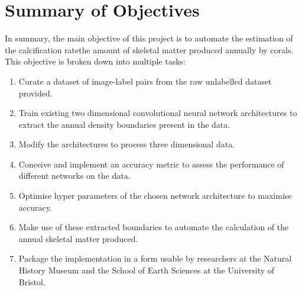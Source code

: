 \section{Summary of Objectives}

In summary, the main objective of this project is to automate the estimation of the calcification rate\textemdash the amount of skeletal matter produced annually by corals. This objective is broken down into multiple tasks:

\begin{enumerate}
    \item Curate a dataset of image-label pairs from the raw unlabelled dataset provided.
    \item Train existing two dimensional convolutional neural network architectures to extract the annual density boundaries present in the data.
    \item Modify the architectures to process three dimensional data.
    \item Conceive and implement an accuracy metric to assess the performance of different networks on the data.
    \item Optimise hyper parameters of the chosen network architecture to maximise accuracy.
    \item Make use of these extracted boundaries to automate the calculation of the annual skeletal matter produced.
    \item Package the implementation in a form usable by researchers at the Natural History Museum and the School of Earth Sciences at the University of Bristol.
\end{enumerate}

